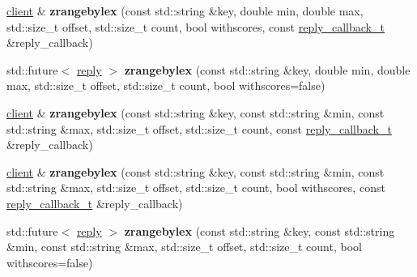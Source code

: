 \begin{DoxyCompactItemize}
\item 
\mbox{\label{classcpp__redis_1_1client_a52d7c1d498be9ba5182d1ea099e3e5ed}} 
\hyperlink{classcpp__redis_1_1client}{client} \& {\bfseries zrangebylex} (const std\+::string \&key, double min, double max, std\+::size\+\_\+t offset, std\+::size\+\_\+t count, bool withscores, const \hyperlink{classcpp__redis_1_1client_a061a1140d36d2eaeda82b09a0bb3f9f2}{reply\+\_\+callback\+\_\+t} \&reply\+\_\+callback)
\item 
\mbox{\label{classcpp__redis_1_1client_a2de8817334902054e27899968c328d9f}} 
std\+::future$<$ \hyperlink{classcpp__redis_1_1reply}{reply} $>$ {\bfseries zrangebylex} (const std\+::string \&key, double min, double max, std\+::size\+\_\+t offset, std\+::size\+\_\+t count, bool withscores=false)
\item 
\mbox{\label{classcpp__redis_1_1client_af982ec533dbf849b88265ccfdcb88210}} 
\hyperlink{classcpp__redis_1_1client}{client} \& {\bfseries zrangebylex} (const std\+::string \&key, const std\+::string \&min, const std\+::string \&max, std\+::size\+\_\+t offset, std\+::size\+\_\+t count, const \hyperlink{classcpp__redis_1_1client_a061a1140d36d2eaeda82b09a0bb3f9f2}{reply\+\_\+callback\+\_\+t} \&reply\+\_\+callback)
\item 
\mbox{\label{classcpp__redis_1_1client_addea645452c87b56111aad26ce4d3bb5}} 
\hyperlink{classcpp__redis_1_1client}{client} \& {\bfseries zrangebylex} (const std\+::string \&key, const std\+::string \&min, const std\+::string \&max, std\+::size\+\_\+t offset, std\+::size\+\_\+t count, bool withscores, const \hyperlink{classcpp__redis_1_1client_a061a1140d36d2eaeda82b09a0bb3f9f2}{reply\+\_\+callback\+\_\+t} \&reply\+\_\+callback)
\item 
\mbox{\label{classcpp__redis_1_1client_ab2a66d6831fb228cb5de0af97080f801}} 
std\+::future$<$ \hyperlink{classcpp__redis_1_1reply}{reply} $>$ {\bfseries zrangebylex} (const std\+::string \&key, const std\+::string \&min, const std\+::string \&max, std\+::size\+\_\+t offset, std\+::size\+\_\+t count, bool withscores=false)
\item 
\mbox{\label{classcpp__redis_1_1client_a520a7c2d2499b67ec1eb791ca3f8cc82}} 

\end{DoxyCompactItemize}
